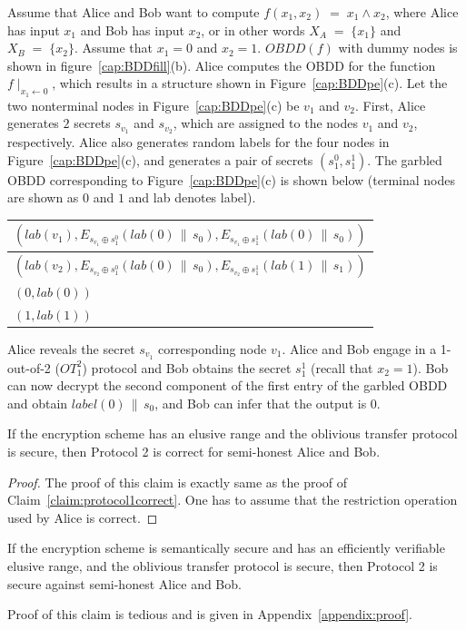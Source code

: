 \begin{example}
\label{example:protocol2}
\rm Assume that Alice and Bob want to compute $f(x_1,x_2)  \; = \; x_1 \wedge x_2$, where
Alice has input $x_1$ and Bob has input $x_2$, or in other words $X_A
\; = \; \{ x_1 \}$ and $X_B \; = \; \{ x_2 \}$.  Assume that $x_1 = 0$
and $x_2 = 1$. $OBDD(f)$ with dummy nodes is shown in
figure~\ref{cap:BDDfill}(b). Alice computes the OBDD for the function
$f \mid_{ x_1 \leftarrow 0}$, which results in a structure shown in
Figure~\ref{cap:BDDpe}(c).  Let the two nonterminal nodes in
Figure~\ref{cap:BDDpe}(c) be $v_1$ and $v_2$. First, Alice generates
$2$ secrets $s_{v_1}$ and  $s_{v_2}$, which are assigned
to the nodes $v_1$ and $v_2$, respectively.   Alice also
generates random labels for the four nodes in
Figure~\ref{cap:BDDpe}(c), and  generates a pair of secrets
$(s_1^0,s_1^1)$. The garbled OBDD corresponding to
Figure~\ref{cap:BDDpe}(c) is shown below (terminal nodes
are shown as $0$ and $1$ and lab denotes label). 
\begin{center}
\begin{tabular}{|l|} \hline
$(lab(v_1), E_{s_{v_1} \oplus s_1^0} (lab(0)  \,\|\, s_0), E_{s_{v_1} \oplus s_1^1} (lab(0) \,\|\, s_0))$ \\ \hline
$(lab(v_2), E_{s_{v_2} \oplus s_1^0} (lab(0) \,\|\, s_0), E_{s_{v_2} \oplus s_1^1} (lab(1) \,\|\, s_1))$ \\ \hline
$(0,lab(0))$ \\ \hline
$(1,lab(1))$ \\ \hline
\end{tabular}
\end{center}
Alice reveals the secret $s_{v_1}$ corresponding node $v_1$.
Alice and Bob engage in a 1-out-of-2 ($OT^2_1$) protocol and Bob obtains the secret $s_1^1$ (recall that
$x_2 = 1$).
Bob can now decrypt the second component of the first entry of the garbled OBDD and
obtain $label(0) \,\|\, s_0$, and  Bob can infer that the output is $0$.
\end{example}

\begin{claim} If the encryption scheme has an elusive range and the
oblivious transfer protocol is secure, then Protocol 2 is correct for
semi-honest Alice and Bob.
\label{claim:protocol2correct}
\end{claim}
\begin{proof}
The proof of this claim is exactly same as the proof of Claim~\ref{claim:protocol1correct}.
One has to assume that the restriction operation used by Alice is correct.
\end{proof}

\begin{claim} If the encryption scheme is semantically secure and has an
efficiently verifiable elusive range, and the oblivious transfer
protocol is secure, then Protocol 2 is secure against semi-honest
Alice and Bob.
\label{claim:protocol2secure}
\end{claim}
Proof of this claim is tedious and is given in Appendix~\ref{appendix:proof}.

